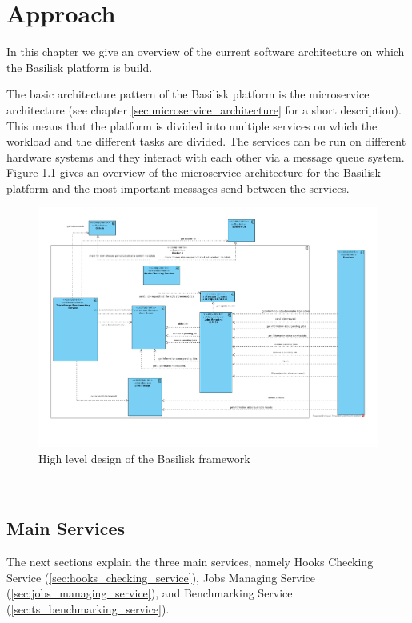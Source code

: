 \chapter{Approach}
\label{ch:approach}

In this chapter we give an overview of the current software architecture on which the Basilisk platform is build.

The basic architecture pattern of the Basilisk platform is the microservice architecture (see chapter \ref{sec:microservice_architecture} for a short description). 
This means that the platform is divided into multiple services on which the workload and the different tasks are divided.
The services can be run on different hardware systems and they interact with each other via a message queue system.
\\


Figure \ref{fig:basilisk_high_level_design} gives an overview of the microservice architecture for the Basilisk platform and the most important messages send between the services.
\begin{figure}[tbph]
	\centering
	\includegraphics[width=1.1\textwidth]{figures/basilisk_high_level_design.pdf}
	\caption{High level design of the Basilisk framework}
	\label{fig:basilisk_high_level_design}
\end{figure}
\\

\section{Main Services}
\label{sec:main_services}
The next sections explain the three main services, namely Hooks Checking Service (\ref{sec:hooks_checking_service}), Jobs Managing Service (\ref{sec:jobs_managing_service}), and \ts{} Benchmarking Service (\ref{sec:ts_benchmarking_service}).




